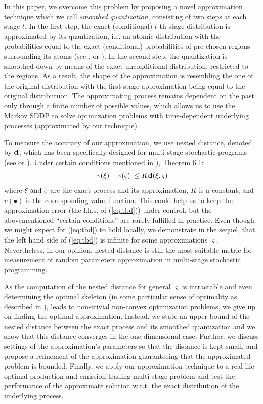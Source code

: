 \documentclass{article}              %
\begin{document}
In this paper, we overcome this problem by proposing a novel approximation technique which we call \emph{smoothed quantization}, consisting of two steps at each stage $t$. In the first step, the exact
(conditional) $t$-th stage distribution is approximated by its quantization,
i.e. an atomic distribution with the probabilities equal to the exact
(conditional) probabilities of pre-chosen regions surrounding its
atoms (see \cite{lohndorf2019modeling}, \cite{kreitmeier2011optimal} or \cite{Pflug01}). In
the second step, the quantization is smoothed down by means of the
exact unconditional distribution, restricted to the regions. As a
result, the shape of the approximation is resembling the one of the original distribution with the first-stage approximation being equal to the original distributuon. The approximating process remains dependent on the past only through a finite number of possible values, which allows us to use the Markov SDDP to solve optimization problems with time-dependent underlying processes (approximated by our technique).

To measure the accuracy of our approximation, we use nested distance, denoted by 
$\mathbf{d}$, which has been specifically designed for multi-stage stochastic programs (see
\cite{pflug2012distance} or \cite{pflug2014multistage}). Under
certain conditions mentioned in \cite{pflug2014multistage}), Theorem 6.1:
\begin{equation}
|v(\xi)-v(\varsigma)|\leq K\mathbf{d}(\xi,\varsigma)\label{eq:tbd}
\end{equation}
where $\text{\ensuremath{\xi} and \ensuremath{\varsigma} }$are the
exact process and its approximation, $K$ is a constant, and $\ensuremath{v(\bullet)}$
is the corresponding value function. This could help us to keep the approximation error (the l.h.s. of (\ref{eq:tbd})) under control, but the abovementioned ``certain conditions'' are rarely
fulfilled in practice. Even though we might expect for (\ref{eq:tbd}) to hold
locally, we demonstrate in the sequel, 
that the left hand side of (\ref{eq:tbd}) is infinite for some approximations $\varsigma$.
Nevertheless, in our opinion, nested distance is still the most
suitable metric for measurement of random parameters approximation in multi-stage stochastic programming.


As the computation of the nested distance for general $\varsigma$ is intractable and even determining the optimal skeleton (in some particular sense of optimality as described in \cite{lohndorf2019modeling}), leads to non-trivial non-convex optimization problems, we give up on finding the optimal approximation. Instead, we state an upper bound
of the nested distance between the exact process and its smoothed
quantization and we show that this distance converges in the one-dimensional
case. Further, we discuss settings of the approximation's parameters so
that the distance is kept small, and propose a refinement of the
approximation guaranteeing that the approximated problem is bounded. 
Finally, we apply our
approximation technique to a real-life optimal production and emission
trading multi-stage problem and test the performance of the approximate
solution w.r.t. the exact distribution of the underlying process.
\end{document}
